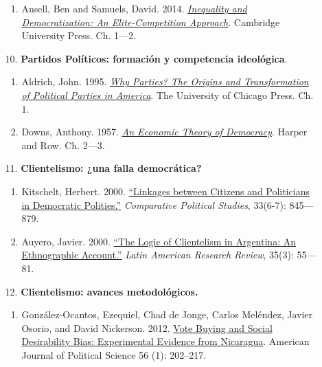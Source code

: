 \documentclass[letterpaper]{article}
\begin{document}
\begin{enumerate}
\begin{enumerate}
\begin{enumerate}
						\item Ansell, Ben and Samuels, David. 2014. \href{https://github.com/hbahamonde/Ciencia_Politica_I/raw/master/Readings/Ansell_Samuels.pdf}{\emph{Inequality and Democratization: An Elite-Competition Approach}}. Cambridge University Press. Ch. 1---2.
					\end{enumerate}

				\item[10.] {\bf Partidos Pol\'iticos: formaci\'on y competencia ideol\'ogica}.
					\begin{enumerate}
						\item Aldrich, John. 1995. \href{https://github.com/hbahamonde/Ciencia_Politica_I/raw/master/Readings/Aldrich_1995.pdf}{\emph{Why Parties? The Origins and Transformation of Political Parties in America}}. The University of Chicago Press. Ch. 1.
						
						\item Downs, Anthony. 1957. \href{https://github.com/hbahamonde/Ciencia_Politica_I/raw/master/Readings/Downs.pdf}{\emph{An Economic Theory of Democracy}}. Harper and Row. Ch. 2---3.
					\end{enumerate}
			
				\item[11.] {\bf Clientelismo: ¿una falla democr\'atica?} 
					\begin{enumerate}
						\item Kitschelt, Herbert. 2000. \href{https://github.com/hbahamonde/Ciencia_Politica_I/raw/master/Readings/Kitschelt.pdf}{``Linkages between Citizens and Politicians in Democratic Polities.''} \emph{Comparative Political Studies}, 33(6-7): 845---879.
					
						\item Auyero, Javier. 2000. \href{https://github.com/hbahamonde/Ciencia_Politica_I/raw/master/Readings/Auyero.pdf}{``The Logic of Clientelism in Argentina: An Ethnographic Account.''} \emph{Latin American Research Review}, 35(3): 55---81.
					\end{enumerate}

				\item[12.] {\bf Clientelismo: avances metodol\'ogicos.} 
					\begin{enumerate}
						\item González-Ocantos, Ezequiel, Chad de Jonge, Carlos Meléndez, Javier Osorio, and David Nickerson. 2012. \href{https://github.com/hbahamonde/Ciencia_Politica_I/raw/master/Readings/Ocantos.pdf}{Vote Buying and Social Desirability Bias: Experimental Evidence from Nicaragua}. American Journal of Political Science 56 (1): 202–217.
					

\end{enumerate}
\end{enumerate}
\end{enumerate}
\end{document}
